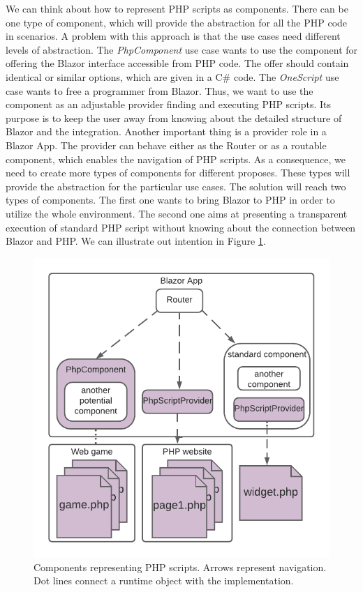 \par
We can think about how to represent PHP scripts as components.
There can be one type of component, which will provide the abstraction for all the PHP code in scenarios.
A problem with this approach is that the use cases need different levels of abstraction.
The \textit{PhpComponent} use case wants to use the component for offering the Blazor interface accessible from PHP code.
The offer should contain identical or similar options, which are given in a C\# code.
The \textit{OneScript} use case wants to free a programmer from Blazor.
Thus, we want to use the component as an adjustable provider finding and executing PHP scripts.
Its purpose is to keep the user away from knowing about the detailed structure of Blazor and the integration.
Another important thing is a provider role in a Blazor App.
The provider can behave either as the Router or as a routable component, which enables the navigation of PHP scripts.
As a consequence, we need to create more types of components for different proposes.
These types will provide the abstraction for the particular use cases.
The solution will reach two types of components.
The first one wants to bring Blazor to PHP in order to utilize the whole environment.
The second one aims at presenting a transparent execution of standard PHP script without knowing about the connection between Blazor and PHP.
We can illustrate out intention in Figure \ref{img12:component}.
\par
\begin{figure}[!b]\centering
\includegraphics[scale=0.9]{./img/Components}
\caption{Components representing PHP scripts. Arrows represent navigation. 
Dot lines connect a runtime object with the implementation.
}
\label{img12:component}
\end{figure} 
